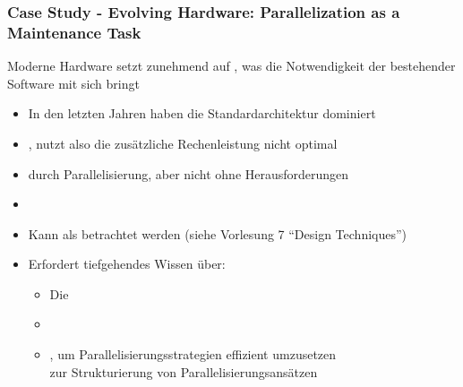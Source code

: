 \subsubsection*{Case Study - Evolving Hardware: Parallelization as a Maintenance Task}
\begin{infoBox}
    Moderne Hardware setzt zunehmend auf , was die Notwendigkeit der  bestehender Software mit sich bringt
\end{infoBox}
\begin{infoBox}[title=Beobachtung]
    \begin{itemize}
        \item In den letzten Jahren haben  die Standardarchitektur dominiert
        \item {}, nutzt also die zusätzliche Rechenleistung nicht optimal
        \item {} durch Parallelisierung, aber nicht ohne Herausforderungen
    \end{itemize}
    \begin{itemize}
        \item {}
        \item Kann als  betrachtet werden (siehe Vorlesung 7 \enquote{Design Techniques})
        \item Erfordert tiefgehendes Wissen über:
        \begin{itemize}
            \item Die 
            \item {}
            \item {}, um Parallelisierungsstrategien effizient umzusetzen\\
             zur Strukturierung von Parallelisierungsansätzen
        \end{itemize}
    \end{itemize}
\end{infoBox}
